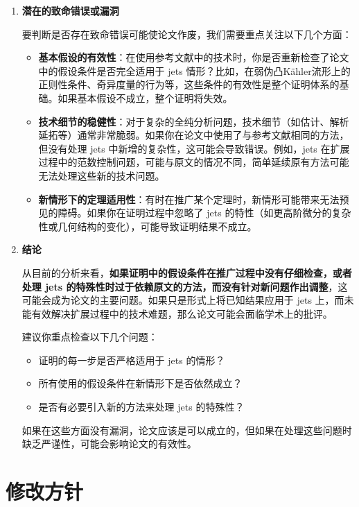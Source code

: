 \documentclass[lang=cn,zihao=-4,twoside,fontset=none]{textbook}
\begin{document}
\begin{enumerate}
    \item \textbf{潜在的致命错误或漏洞}

    要判断是否存在致命错误可能使论文作废，我们需要重点关注以下几个方面：

    \begin{itemize}
        \item \textbf{基本假设的有效性}：在使用参考文献中的技术时，你是否重新检查了论文中的假设条件是否完全适用于 jets 情形？比如，在弱伪凸Kähler流形上的正则性条件、奇异度量的行为等，这些条件的有效性是整个证明体系的基础。如果基本假设不成立，整个证明将失效。

        \item \textbf{技术细节的稳健性}：对于复杂的全纯分析问题，技术细节（如估计、解析延拓等）通常非常脆弱。如果你在论文中使用了与参考文献相同的方法，但没有处理 jets 中新增的复杂性，这可能会导致错误。例如，jets 在扩展过程中的范数控制问题，可能与原文的情况不同，简单延续原有方法可能无法处理这些新的技术问题。

        \item \textbf{新情形下的定理适用性}：有时在推广某个定理时，新情形可能带来无法预见的障碍。如果你在证明过程中忽略了 jets 的特性（如更高阶微分的复杂性或几何结构的变化），可能导致证明结果不成立。
    \end{itemize}

    \item \textbf{结论}

    从目前的分析来看，\textbf{如果证明中的假设条件在推广过程中没有仔细检查，或者处理 jets 的特殊性时过于依赖原文的方法，而没有针对新问题作出调整}，这可能会成为论文的主要问题。如果只是形式上将已知结果应用于 jets 上，而未能有效解决扩展过程中的技术难题，那么论文可能会面临学术上的批评。

    建议你重点检查以下几个问题：
    \begin{itemize}
        \item 证明的每一步是否严格适用于 jets 的情形？
        \item 所有使用的假设条件在新情形下是否依然成立？
        \item 是否有必要引入新的方法来处理 jets 的特殊性？
    \end{itemize}

    如果在这些方面没有漏洞，论文应该是可以成立的，但如果在处理这些问题时缺乏严谨性，可能会影响论文的有效性。
\end{enumerate}
\newpage
\section{修改方针}
\end{document}
